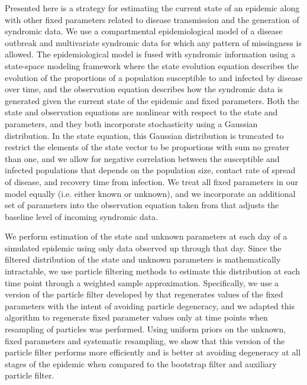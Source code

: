
Presented here is a strategy for estimating the current state of an epidemic along with other fixed parameters related to disease transmission and the generation of syndromic data. We use a compartmental epidemiological model of a disease outbreak and multivariate syndromic data for which any pattern of missingness is allowed. The epidemiological model is fused with syndromic information using a state-space modeling framework where the state evolution equation describes the evolution of the proportions of a population susceptible to and infected by disease over time, and the observation equation describes how the syndromic data is generated given the current state of the epidemic and fixed parameters. Both the state and observation equations are nonlinear with respect to the state and parameters, and they both incorporate stochasticity using a Gaussian distribution. In the state equation, this Gaussian distribution is truncated to restrict the elements of the state vector to be proportions with sum no greater than one, and we allow for negative correlation between the susceptible and infected populations that depends on the population size, contact rate of spread of disease, and recovery time from infection. We treat all fixed parameters in our model equally (i.e. either known or unknown), and we incorporate an additional set of parameters into the observation equation taken from \citet{skvortsov2012monitoring} that adjusts the baseline level of incoming syndromic data.

We perform estimation of the state and unknown parameters at each day of a simulated epidemic using only data observed up through that day. Since the filtered distribution of the state and unknown parameters is mathematically intractable, we use particle filtering methods to estimate this distribution at each time point through a weighted sample approximation. Specifically, we use a version of the particle filter developed by \citet{Liu:West:comb:2001} that regenerates values of the fixed parameters with the intent of avoiding particle degeneracy, and we adapted this algorithm to regenerate fixed parameter values only at time points when resampling of particles was performed. Using uniform priors on the unknown, fixed parameters and systematic resampling, we show that this version of the particle filter performs more efficiently and is better at avoiding degeneracy at all stages of the epidemic when compared to the bootstrap filter and auxiliary particle filter.

